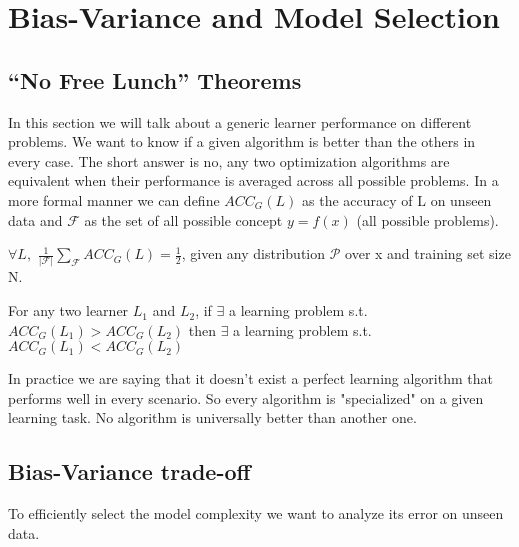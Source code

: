 \documentclass[main.tex]{subfiles}
\begin{document}
\section{Bias-Variance and Model Selection}
\subsection{“No Free Lunch” Theorems}
In this section we will talk about a generic learner performance on different problems. We want to know if a given algorithm is better than the others in every case. The short answer is no, any two optimization algorithms are equivalent when their performance is averaged across all possible problems. In a more formal manner we can define $ACC_G(L)$ as the accuracy of L on unseen data and $\mathcal{F}$ as the set of all possible concept $y=f(x)$ (all possible problems).
\begin{theorem}
$\forall L,$ $\frac{1}{|\mathcal{F}|} \sum_{\mathcal{F}} ACC_G(L) = \frac{1}{2}$, given any distribution $\mathcal{P}$ over x and training set size N.
\end{theorem}
\begin{corollary}
For any two learner $L_1$ and $L_2$, if $\exists$ a learning problem s.t. $ACC_G(L_1)>ACC_G(L_2)$ then $\exists$ a learning problem s.t. $ACC_G(L_1)<ACC_G(L_2)$
\end{corollary}
In practice we are saying that it doesn't exist a perfect learning algorithm that performs well in every scenario. So every algorithm is "specialized" on a given learning task. No algorithm is universally better than another one.

\subsection{Bias-Variance trade-off}
To efficiently select the model complexity we want to analyze its error on unseen data.
\end{document}
